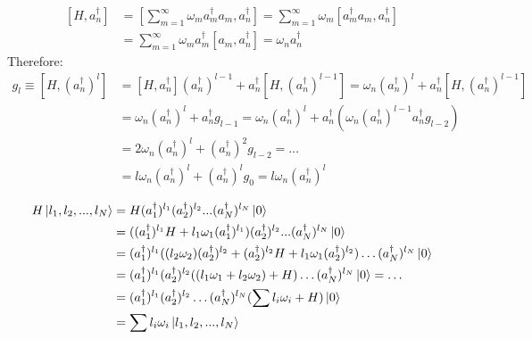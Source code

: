 \documentclass{article}
\begin{document}
\begin{equation}
\begin{split}
    [H, a_n^\dagger]&=[\sum_{m=1}^\infty \omega_ma_m^\dagger a_m, a_n^\dagger] = \sum_{m=1}^\infty \omega_m [a_m^\dagger a_m, a_n^\dagger] \\
    & = \sum_{m=1}^\infty \omega_m a_m^\dagger [a_m,a_n^\dagger] = \omega_na_n^\dagger
    \end{split}
\end{equation}
Therefore:
\begin{equation}
    \begin{split}
        g_l \equiv [H, (a_n^\dagger)^l] &= [H,a_n^\dagger](a_n^\dagger)^{l-1} + a_n^\dagger[H,(a_n^\dagger)^{l-1}] = \omega_n(a_n^\dagger)^l + a_n^\dagger[H,(a_n^\dagger)^{l-1}]\\
        &= \omega_n(a_n^\dagger)^l + a_n^\dagger g_{l-1} = \omega_n(a_n^\dagger)^l + a_n^\dagger(\omega_n(a_n^\dagger)^{l-1}
        a_n^\dagger g_{l-2} ) \\
        &=  2\omega_n(a_n^\dagger)^l + (a_n^\dagger)^2 g_{l-2} = \dots \\
        &= l\omega_n(a_n^\dagger)^l + (a_n^\dagger)^l g_0 =  l\omega_n(a_n^\dagger)^l
    \end{split}
\end{equation}

\begin{equation}
    \begin{split}
        H\ket{l_1,l_2,...,l_N} &= H(a_1^\dagger)^{l_1}(a_2^\dagger)^{l_2}...(a_N^\dagger)^{l_N}\ket{0} \\
        & = ((a_1^\dagger)^{l_1}H + l_1\omega_1(a_1^\dagger)^{l_1})(a_2^\dagger)^{l_2}...(a_N^\dagger)^{l_N}\ket{0} \\
        & = (a_1^\dagger)^{l_1}((l_2\omega_2)(a_2^\dagger)^{l_2} + (a_2^\dagger)^{l_2}H + l_1\omega_1 (a_2^\dagger)^{l_2})
        \dots (a_N^\dagger)^{l_N}\ket{0}\\
        & = (a_1^\dagger)^{l_1} (a_2^\dagger)^{l_2} ( (l_1\omega_1 + l_2\omega_2) + H) \dots (a_N^\dagger)^{l_N}\ket{0} = \dots\\
        & = (a_1^\dagger)^{l_1} (a_2^\dagger)^{l_2}\dots (a_N^\dagger)^{l_N} (\sum l_i\omega_i + H )\ket{0} \\
        &= \sum l_i\omega_i \ket{l_1,l_2,...,l_N}
    \end{split}
\end{equation}
\end{document}
